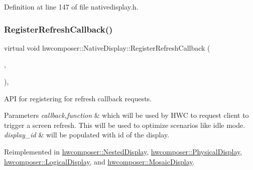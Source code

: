 Definition at line 147 of file nativedisplay.\+h.


\begin{DoxyCode}{0}
\end{DoxyCode}
\mbox{\label{classhwcomposer_1_1NativeDisplay_a237627e6cacf9246813bc7f48c5817cd}} 
\subsubsection{\texorpdfstring{Register\+Refresh\+Callback()}{RegisterRefreshCallback()}}
{\footnotesize\ttfamily virtual void hwcomposer\+::\+Native\+Display\+::\+Register\+Refresh\+Callback (\begin{DoxyParamCaption}\item[{std\+::shared\+\_\+ptr$<$ \mbox{\hyperlink{classhwcomposer_1_1RefreshCallback}{Refresh\+Callback}} $>$}]{,  }\item[{uint32\+\_\+t}]{ }\end{DoxyParamCaption})\hspace{0.3cm}{\ttfamily [inline]}, {\ttfamily [virtual]}}

A\+PI for registering for refresh callback requests. 
\begin{DoxyParams}{Parameters}
{\em callback,function} & which will be used by H\+WC to request client to trigger a screen refresh. This will be used to optimize scenarios like idle mode. \\
\hline
{\em display\+\_\+id} & will be populated with id of the display. \\
\hline
\end{DoxyParams}


Reimplemented in \mbox{\hyperlink{classhwcomposer_1_1NestedDisplay_a821c1f2bf3622c4889e8c84f2a6935d3}{hwcomposer\+::\+Nested\+Display}}, \mbox{\hyperlink{classhwcomposer_1_1PhysicalDisplay_aaa21f6de6805e8e6d0d5771c3207cfd6}{hwcomposer\+::\+Physical\+Display}}, \mbox{\hyperlink{classhwcomposer_1_1LogicalDisplay_a53dd3b4a4ee95af6a903327519278691}{hwcomposer\+::\+Logical\+Display}}, and \mbox{\hyperlink{classhwcomposer_1_1MosaicDisplay_a1deecbf2ba9b007fa7529b31da47d575}{hwcomposer\+::\+Mosaic\+Display}}.



